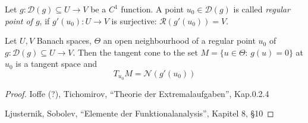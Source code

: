 \begin{definition}\label{definition_1.30}
	Let $g:\mathcal{D}(g)\subseteq U\to V$ be a $C^1$ function. A point $u_0\in\mathcal{D}(g)$ is called \emph{regular point of $g$}, if $g'(u_0):U\to V$ is surjective: $\mathcal{R}(g'(u_0)) = V$.
\end{definition}

\begin{theorem}\label{theorem_1.31}
	Let $U,V$ Banach spaces, $\Theta$ an open neighbourhood of a regular point $u_0$ of $g:\mathcal{D}(g)\subseteq U\to V$. Then the tangent cone to the set $M = \{u\in\Theta:\,g(u) = 0\}$ at $u_0$ is a tangent space and
	\[
		T_{u_0}M = \mathcal{N}(g'(u_0))
	\]
\end{theorem}
\begin{proof}
	Ioffe (?), Tichomirov, ``Theorie der Extremalaufgaben'', Kap.0.2.4\par
	Ljusternik, Sobolev, ``Elemente der Funktionalanalysis'', Kapitel 8, §10 
\end{proof}